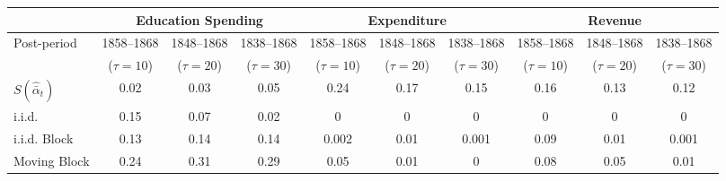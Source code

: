 \begin{tabular}{@{}lccccccccc@{}}
		\toprule
		 & \multicolumn{3}{c}{Education Spending}        & \multicolumn{3}{c}{Expenditure}            & \multicolumn{3}{c}{Revenue}                \\ \midrule
Post-period	 & 1858--1868     & 1848--1868      & 1838--1868      & 1858--1868     & 1848--1868      & 1838--1868  	  & 1858--1868     & 1848--1868      & 1838--1868   \\
	 	 & ($\tau = 10$)  & ($\tau = 20$)   & ($\tau = 30$)   & ($\tau = 10$)  & ($\tau = 20$)  & ($\tau = 30$)   &  ($\tau = 10$)  &  ($\tau = 20$)  &  ($\tau = 30$)  \\
		\hline
		$S (\hat{\bar{\alpha}}_{t})$        &   0.02       	 & 	0.03       	  & 	0.05       &        0.24    &   0.17	       & 	0.15	   & 	0.16       &   0.13        & 	0.12\\
		i.i.d.                      		&   0.15		 &  0.07		  & 	0.02	   & 		0	   	& 	0		   	   &	 	0	   & 	0		   & 	0		   & 	0	\\
		i.i.d. Block                        & 	0.13  		 &  0.14		  & 	0.14	   & 		0.002	& 	0.01		   & 	0.001	   & 	0.09	   & 	0.01	   & 	0.001 \\
		Moving Block                        & 	0.24	     &  0.31		  & 	0.29	   & 		0.05    &   0.01 		   & 	0		   &    0.08	   & 	0.05 	   & 0.01 \\ \bottomrule
\end{tabular}

